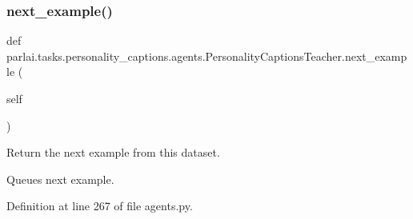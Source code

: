 \subsubsection{\texorpdfstring{next\+\_\+example()}{next\_example()}}
{\footnotesize\ttfamily def parlai.\+tasks.\+personality\+\_\+captions.\+agents.\+Personality\+Captions\+Teacher.\+next\+\_\+example (\begin{DoxyParamCaption}\item[{}]{self }\end{DoxyParamCaption})}

\begin{DoxyVerb}Return the next example from this dataset.

Queues next example.
\end{DoxyVerb}
 

Definition at line 267 of file agents.\+py.



